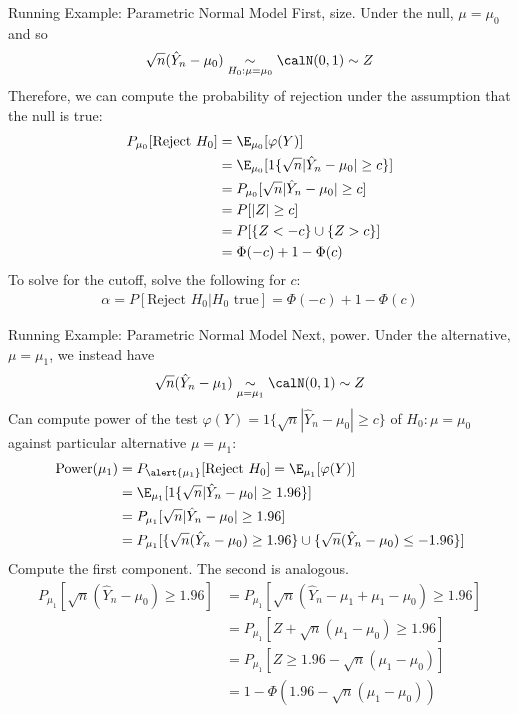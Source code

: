 \documentclass[aspectratio=169, handout]{beamer}
\begin{document}
{\footnotesize
\begin{frame}{Running Example: Parametric Normal Model}
First, \alert{size}.
Under the null, $\mu=\mu_0$ and so
\begin{align*}
  \sqrt{n}(\hat{Y}_n - \mu_0)
  \underset{H_0:\mu=\mu_0}{\sim}
  \calN(0,1)\sim Z
\end{align*}
\pause
Therefore, we can compute the probability of rejection under the
assumption that the null is true:
\begin{align*}
  P_{\mu_0}[\text{Reject $H_0$}]
  &=
  \E_{\mu_0}[\varphi(Y)]
  \\
  &=
  \E_{\mu_0}[{1}\{\sqrt{n}|\hat{Y}_n-\mu_0|\geq c\}]
  \\
  &=
  P_{\mu_0}[\sqrt{n}|\hat{Y}_n-\mu_0|\geq c]
  \\
  &=
  P[|Z|\geq c]
  \\
  &=
  P[\{Z<-c\} \cup \{Z>c\}]
  \\
  &=
  \Phi(-c)
  +
  1-\Phi(c)
\end{align*}
\pause
To solve for the cutoff, solve the following for $c$:
\begin{align*}
  \alpha
  =
  P[\text{Reject $H_0$}|\text{$H_0$ true}]
  =
  \Phi(-c)
  +
  1-\Phi(c)
\end{align*}
\end{frame}
}


{\footnotesize
\begin{frame}{Running Example: Parametric Normal Model}
Next, \alert{power}.
Under the alternative, $\mu=\mu_1$, we instead have
\begin{align*}
  \sqrt{n}(\hat{Y}_n - \mu_1)
  \underset{\mu=\mu_1}{\sim}
  \calN(0,1)\sim Z
\end{align*}
\pause
Can compute power of the test
$\varphi(Y)={1}\{\sqrt{n}|\hat{Y}_n-\mu_0|\geq c\}$
of $H_0:\mu=\mu_0$ against
particular alternative $\mu=\mu_1$:
\begin{align*}
  \text{Power}(\mu_1)
  &=
  P_{\alert{\mu_1}}[\text{Reject $H_0$}]
  =
  \E_{{\mu_1}}[\varphi(Y)]
  \\
  &=
  \E_{\mu_1}[{1}\{\sqrt{n}|\hat{Y}_n-\mu_0|\geq 1.96\}]
  \\
  &=
  P_{\mu_1}[\sqrt{n}|\hat{Y}_n-\mu_0|\geq 1.96]
  \\
  &=
  P_{\mu_1}[
    \{
    \sqrt{n}(\hat{Y}_n-\mu_0)\geq 1.96
    \}
    \cup
    \{
    \sqrt{n}(\hat{Y}_n-\mu_0)\leq -1.96
    \}
  ]
\end{align*}
\pause
Compute the first component.
The second is analogous.
\begin{align*}
  P_{\mu_1}[
    \sqrt{n}(\hat{Y}_n-\mu_0)\geq 1.96
  ]
  &=
  P_{\mu_1}[
    \sqrt{n}(\hat{Y}_n-\mu_1+\mu_1-\mu_0)\geq 1.96
  ]
  \\
  &=
  P_{\mu_1}[
    Z+\sqrt{n}(\mu_1-\mu_0)\geq 1.96
  ]
  \\
  &=
  P_{\mu_1}[
    Z\geq 1.96-\sqrt{n}(\mu_1-\mu_0)
  ]
  \\
  &=
  1-\Phi\left(
    1.96-\sqrt{n}(\mu_1-\mu_0)
  \right)
\end{align*}
\end{frame}
}
\end{document}
